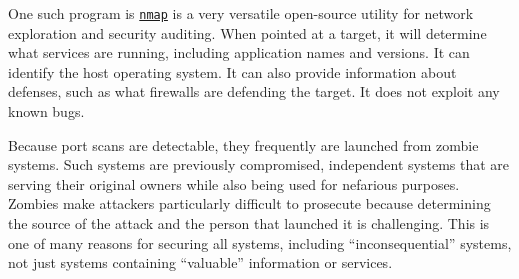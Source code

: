 One such program is \href{https://www.insecure.org/nmap/}{\texttt{nmap}} is a very versatile open-source utility for network exploration and security auditing.
When pointed at a target, it will determine what services are running, including application names and versions.
It can identify the host operating system.
It can also provide information about defenses, such as what firewalls are defending the target.
It does not exploit any known bugs.

Because port scans are detectable, they frequently are launched from zombie systems.
Such systems are previously compromised, independent systems that are serving their original owners while also being used for nefarious purposes.
Zombies make attackers particularly difficult to prosecute because determining the source of the attack and the person that launched it is challenging.
This is one of many reasons for securing all systems, including ``inconsequential'' systems, not just systems containing ``valuable'' information or services.


